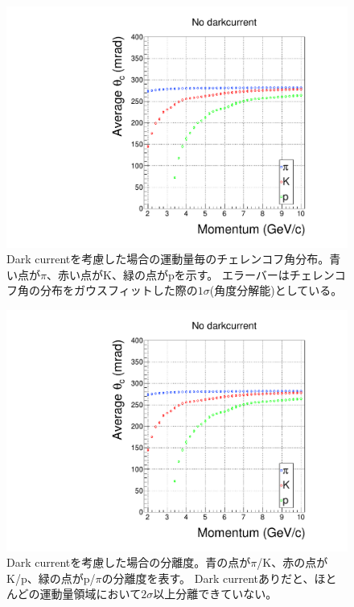 \begin{figure}[htbp]
  \centering
  \includegraphics[width=15cm,page=2]{images/chapter4/angleAndMultiGraph.pdf}
  \caption{
    Dark currentを考慮した場合の運動量毎のチェレンコフ角分布。青い点が$\pi$、赤い点がK、緑の点がpを示す。
    エラーバーはチェレンコフ角の分布をガウスフィットした際の$1\sigma$(角度分解能)としている。
  }
  \label{fig:angleMultiGraph2}
\end{figure}

\begin{figure}[htbp]
  \centering
  \includegraphics[width=15cm,page=30]{images/chapter4/angleAndMultiGraph.pdf}
  \caption{
    Dark currentを考慮した場合の分離度。青の点が$\pi$/K、赤の点がK/p、緑の点がp/$\pi$の分離度を表す。
    Dark currentありだと、ほとんどの運動量領域において$2\sigma$以上分離できていない。
  }
  \label{fig:angleMultiGraph4}
\end{figure}